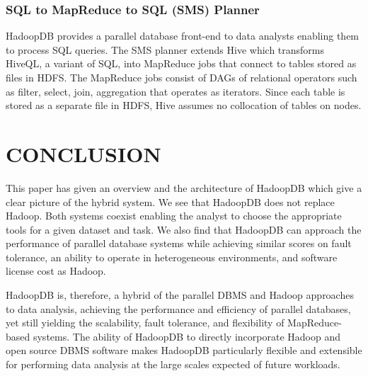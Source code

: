 \documentclass[9pt,twocolumn,twoside]{../../styles/osajnl}
\begin{document}
\subsubsection{SQL to MapReduce to SQL (SMS) Planner}
HadoopDB provides a parallel database front-end to data analysts enabling them to process SQL queries. The SMS planner extends Hive\cite{facebook-hive} which transforms HiveQL, a variant of SQL, into MapReduce jobs that connect to tables stored
as files in HDFS. The MapReduce jobs consist of DAGs of relational operators such as filter, select, join, aggregation that operates as iterators. Since each table is stored as a
separate file in HDFS, Hive assumes no collocation of tables on nodes.


\section{CONCLUSION}

This paper has given an overview and the architecture of HadoopDB which give a clear picture of the hybrid system. We see that HadoopDB does not replace Hadoop. Both systems coexist enabling the analyst to choose the appropriate tools for a given dataset and task.  We also find that HadoopDB can approach the performance of parallel database systems while achieving similar scores on fault tolerance, an ability to operate in heterogeneous environments, and software license cost as Hadoop. 

HadoopDB is, therefore, a hybrid of the parallel DBMS and Hadoop approaches to data analysis, achieving the performance and efficiency of parallel databases, yet still yielding the scalability, fault tolerance, and flexibility of MapReduce-based systems. The ability of HadoopDB to directly incorporate Hadoop and open source DBMS software makes HadoopDB particularly flexible and extensible for performing data
analysis at the large scales expected of future workloads.


\end{document}
